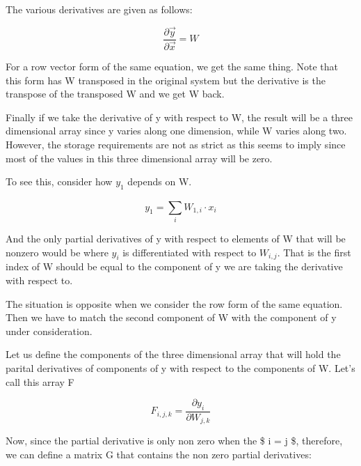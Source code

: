 \documentclass[11pt]{article}
\begin{document}
The various derivatives are given as follows: 

\begin{center}
\begin{equation}
{\dfrac { \partial{ \vec{y} } } { \partial{ \vec{x} } } }  = W  


\end{equation}
\end{center}

For a row vector form of the same equation, we get the same thing. Note that 
this form has W transposed in the original system but the derivative is the 
transpose of the transposed W and we get W back. 

Finally if we take the derivative of y with respect to W, the result will be
a three dimensional array since y varies along one dimension, while W varies 
along two. However, the storage requirements are not as strict as this seems 
to imply since most of the values in this three dimensional array will be zero. 

To see this, consider how \(y_1\) depends on W. 

\begin{center}
\begin{equation}

y_1 = \sum_{i}^{} W_{1,i} \cdot x_i

\end{equation} 
\end{center}

And the only partial derivatives of y with respect to elements of W that will be nonzero
would be where \(y_i\) is differentiated with respect to \(W_{i,j}\). That is the first 
index of W should be equal to the component of y we are taking the derivative with respect
to.

The situation is opposite when we consider the row form of the same equation. Then we have to 
match the second component of W with the component of y under consideration.

Let us define the components of the three dimensional array that will hold the parital derivatives of
components of y with respect to the components of W. Let's call this array F

\begin{center}
\begin{equation}
F_{i,j,k} = \dfrac { \partial{y_i} } { \partial{W_{j,k} } } 
\end{equation}
\end{center}

Now, since the partial derivative is only non zero when the \$ i = j \$, therefore, 
we can define a matrix G that contains the non zero partial derivatives: 
\end{document}
